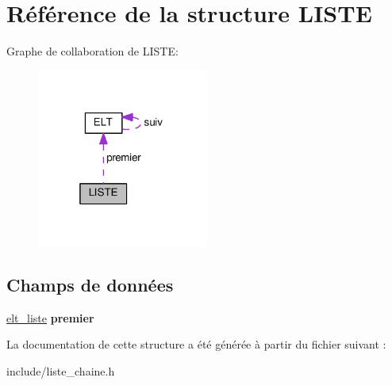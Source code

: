\hypertarget{structLISTE}{}\section{Référence de la structure L\+I\+S\+TE}
\label{structLISTE}


Graphe de collaboration de L\+I\+S\+TE\+:
\nopagebreak
\begin{figure}[H]
\begin{center}
\leavevmode
\includegraphics[width=160pt]{structLISTE__coll__graph}
\end{center}
\end{figure}
\subsection*{Champs de données}
\begin{DoxyCompactItemize}
\item 
\hyperlink{structELT}{elt\+\_\+liste} {\bfseries premier}\hypertarget{structLISTE_a6cd2848fc95de0497e8da669bd46ceb4}{}\label{structLISTE_a6cd2848fc95de0497e8da669bd46ceb4}

\end{DoxyCompactItemize}


La documentation de cette structure a été générée à partir du fichier suivant \+:\begin{DoxyCompactItemize}
\item 
include/liste\+\_\+chaine.\+h\end{DoxyCompactItemize}
